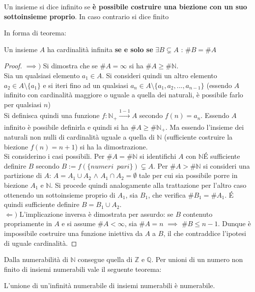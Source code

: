 \documentclass[10pt]{article}
\theoremstyle{plain}
\begin{document}
\begin{defin}
    Un insieme si dice infinito se \textbf{è possibile costruire una biezione con un suo sottoinsieme proprio}. In caso contrario si dice finito
\end{defin}
In forma di teorema:
\begin{ther}
    Un insieme $A$ ha cardinalità infinita \textbf{se e solo se} $\exists B \subsetneq A$ : $\#B = \#A$
\end{ther}
\begin{proof}
    $\mathbf{\implies)}$ Si dimostra che se $\#A = \infty$ si ha $\#A \geq \#\mathbb{N}$. 
    \\Sia un qualsiasi elemento $a_1 \in A$. Si consideri quindi un altro elemento $a_2 \in A \setminus \{a_1\}$ e si iteri fino ad un qualsiasi $a_n \in A \setminus \{a_1, a_2, ..., a_{n-1}\}$ (essendo $A$ infinito con cardinalità maggiore o uguale a quella dei naturali, è possibile farlo per qualsiasi $n$)
    \\Si definisca quindi una funzione $f: \mathbb{N}_+ \xrightarrow[]{1-1} A$ secondo $f(n) = a_n$. Essendo $A$ infinito è possibile definirla e quindi si ha $\#A \geq \#\mathbb{N}_+$. Ma essendo l'insieme dei naturali non nulli di cardinalità uguale a quella di $\mathbb{N}$ (sufficiente costruire la biezione $f(n) = n+1$) si ha la dimostrazione.
    \\Si considerino i casi possibili. Per $\#A = \#\mathbb{N}$ si identifichi $A$ con $\mathbb{N}$\'E sufficiente definire $B$ secondo $B := f(\{numeri \enspace pari\}) \subsetneq A$. Per $\#A > \#\mathbb{N}$ si consideri una partizione di $A$: $A = A_1 \cup A_2$ $\land$ $A_1 \cap A_2 = \emptyset$ tale per cui sia possibile porre in biezione $A_1$ e $\mathbb{N}$. Si procede quindi analogamente alla trattazione per l'altro caso ottenendo un sottoinsieme proprio di $A_1$, sia $B_1$, che verifica $\#B_1 = \#A_1$. \'E quindi sufficiente definire $B = B_1 \cup A_2$.
    \\$\mathbf{\Leftarrow)}$ L'implicazione inversa è dimostrata per assurdo: se $B$ contenuto propriamente in $A$ e si assume $\#A < \infty$, sia $\#A = n$ $\implies$ $\#B \leq n-1$. Dunque è impossibile costruire una funzione iniettiva da $A$ a $B$, il che contraddice l'ipotesi di uguale cardinalità.
\end{proof}
Dalla numerabilità di $\mathbb{N}$ consegue quella di $\mathbb{Z}$ e $\mathbb{Q}$. Per unioni di un numero non finito di insiemi numerabili vale il seguente teorema:
\begin{ther}
    L'unione di un'infinità numerabile di insiemi numerabili è numerabile.
\end{ther}
\end{document}
